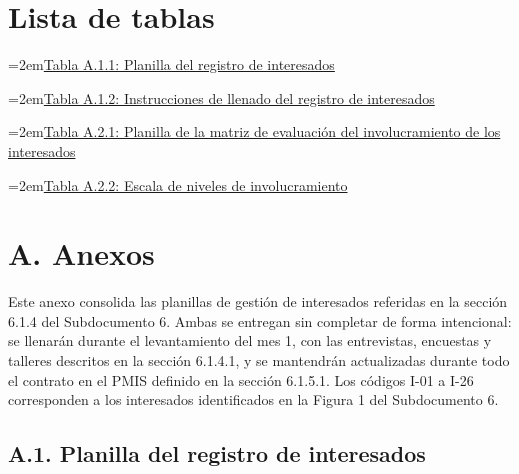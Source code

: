 \documentclass[11pt]{article}
\begin{document}
\hypersetup{pageanchor=false}
\hypersetup{pageanchor=true}
\makeatletter\renewcommand{\@pnumwidth}{2.2em}\makeatother
\tableofcontents
\clearpage

\renewcommand{\tablename}{Tabla}
\section*{Lista de tablas}

\noindent\hangindent=2em\hyperref[tab:a-1-1]{Tabla A.1.1: Planilla del registro de interesados}\dotfill\pageref{tab:a-1-1}\par\vspace{0.4\baselineskip}
\noindent\hangindent=2em\hyperref[tab:a-1-2]{Tabla A.1.2: Instrucciones de llenado del registro de interesados}\dotfill\pageref{tab:a-1-2}\par\vspace{0.4\baselineskip}
\noindent\hangindent=2em\hyperref[tab:a-2-1]{Tabla A.2.1: Planilla de la matriz de evaluación del involucramiento de los interesados}\dotfill\pageref{tab:a-2-1}\par\vspace{0.4\baselineskip}
\noindent\hangindent=2em\hyperref[tab:a-2-2]{Tabla A.2.2: Escala de niveles de involucramiento}\dotfill\pageref{tab:a-2-2}\par\vspace{0.4\baselineskip}
\clearpage

\section{A. Anexos}\label{a-anexos}

Este anexo consolida las planillas de gestión de interesados referidas en la sección 6.1.4 del Subdocumento 6. Ambas se entregan sin completar de forma intencional: se llenarán durante el levantamiento del mes 1, con las entrevistas, encuestas y talleres descritos en la sección 6.1.4.1, y se mantendrán actualizadas durante todo el contrato en el PMIS definido en la sección 6.1.5.1. Los códigos I-01 a I-26 corresponden a los interesados identificados en la Figura 1 del Subdocumento 6.

\subsection{A.1. Planilla del registro de interesados}\label{a-1-planilla-del-registro-de-interesados}
\end{document}
